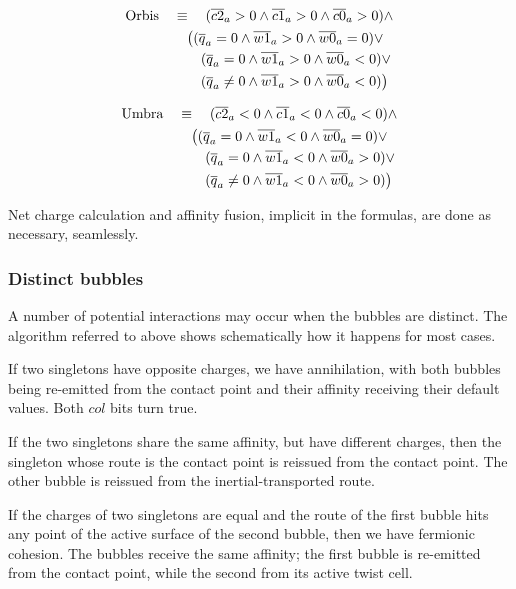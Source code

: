 \documentclass[12pt,english]{article}
\begin{document}
\begin{align}
    \text{Orbis} \quad &\equiv \quad (\overline{c2}_a > 0 \wedge \overline{c1}_a > 0 \wedge \overline{c0}_a > 0) \wedge \notag \\
    &\quad \big( (\overline{q}_a = 0 \wedge \overline{w1}_a > 0 \wedge \overline{w0}_a = 0) \vee \notag \\
    &\quad\quad (\overline{q}_a = 0 \wedge \overline{w1}_a > 0 \wedge \overline{w0}_a < 0) \vee \notag \\
    &\quad\quad (\overline{q}_a \neq 0 \wedge \overline{w1}_a > 0 \wedge \overline{w0}_a < 0) \big)
\end{align}

\begin{align}
    \text{Umbra} \quad &\equiv \quad (\overline{c2}_a < 0 \wedge \overline{c1}_a < 0 \wedge \overline{c0}_a < 0) \wedge \notag \\
    &\quad \big( (\overline{q}_a = 0 \wedge \overline{w1}_a < 0 \wedge \overline{w0}_a = 0) \vee \notag \\
    &\quad\quad (\overline{q}_a = 0 \wedge \overline{w1}_a < 0 \wedge \overline{w0}_a > 0) \vee \notag \\
    &\quad\quad (\overline{q}_a \neq 0 \wedge \overline{w1}_a < 0 \wedge \overline{w0}_a > 0) \big)
\end{align}

Net charge calculation and affinity fusion, implicit in the formulas, are done as necessary, seamlessly.

\subsubsection{Distinct bubbles} \label{subsec:distinct}
A number of potential interactions may occur when the bubbles are distinct. The algorithm referred to above shows schematically how it happens for most cases.

If two singletons have opposite charges, we have annihilation, with both bubbles being re-emitted from the contact point and their affinity receiving their default values. Both $col$ bits turn true.

If the two singletons share the same affinity, but have different charges, then the singleton whose route is the contact point is reissued from the contact point. The other bubble is reissued from the inertial-transported route.

If the charges of two singletons are equal and the route of the first bubble hits any point of the active surface of the second bubble, then we have fermionic cohesion. The bubbles receive the same affinity; the first bubble is re-emitted from the contact point, while the second from its active twist cell.
\end{document}
